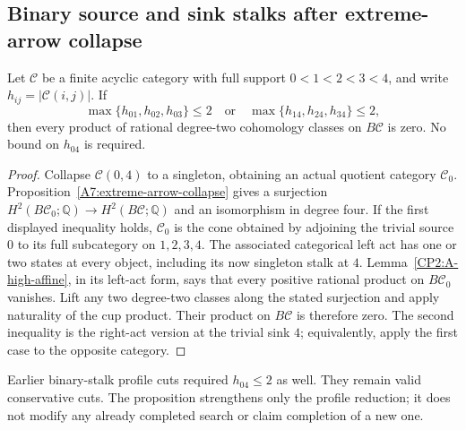 \subsection{Binary source and sink stalks after extreme-arrow collapse}

\begin{proposition}
\label{A7:binary-extreme-collapse}
Let $\mathcal C$ be a finite acyclic category with full support
$0<1<2<3<4$, and write $h_{ij}=|\mathcal C(i,j)|$.
If
\[
 \max\{h_{01},h_{02},h_{03}\}\leq2
 \quad\text{or}\quad
 \max\{h_{14},h_{24},h_{34}\}\leq2,
\]
then every product of rational degree-two cohomology classes on
$B\mathcal C$ is zero.  No bound on $h_{04}$ is required.
\end{proposition}
\begin{proof}
Collapse $\mathcal C(0,4)$ to a singleton, obtaining an actual
quotient category $\mathcal C_0$.  Proposition~\ref{A7:extreme-arrow-collapse}
gives a surjection
$H^2(B\mathcal C_0;\mathbb Q)\to H^2(B\mathcal C;\mathbb Q)$
and an isomorphism in degree four.  If the first displayed
inequality holds, $\mathcal C_0$ is the cone obtained by adjoining
the trivial source $0$ to its full subcategory on $1,2,3,4$.
The associated categorical left act has one or two states at
every object, including its now singleton stalk at $4$.
Lemma~\ref{CP2:A-high-affine}, in its left-act form, says that
every positive rational product on $B\mathcal C_0$ vanishes.
Lift any two degree-two classes along the stated surjection
and apply naturality of the cup product.  Their product on
$B\mathcal C$ is therefore zero.  The second inequality is
the right-act version at the trivial sink $4$; equivalently,
apply the first case to the opposite category.
\end{proof}

\begin{remark*}
Earlier binary-stalk profile cuts required $h_{04}\leq2$ as
well.  They remain valid conservative cuts.  The proposition
strengthens only the profile reduction; it does not modify
any already completed search or claim completion of a new one.
\end{remark*}
